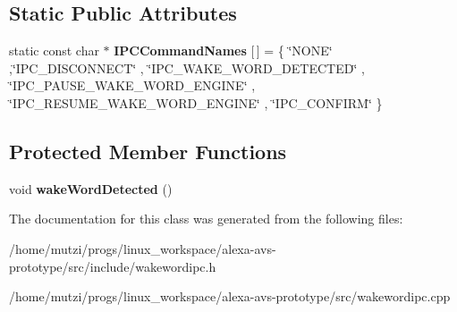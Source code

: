 \subsection*{Static Public Attributes}
\begin{DoxyCompactItemize}
\item 
\mbox{\label{classWakeWord_1_1WakeWordIPC_a1cfa16e30c0ce47fbe759b0f31656a19}} 
static const char $\ast$ {\bfseries I\+P\+C\+Command\+Names} \mbox{[}$\,$\mbox{]} = \{ \char`\"{}N\+O\+NE\char`\"{} ,\char`\"{}I\+P\+C\+\_\+\+D\+I\+S\+C\+O\+N\+N\+E\+CT\char`\"{} , \char`\"{}I\+P\+C\+\_\+\+W\+A\+K\+E\+\_\+\+W\+O\+R\+D\+\_\+\+D\+E\+T\+E\+C\+T\+ED\char`\"{} , \char`\"{}I\+P\+C\+\_\+\+P\+A\+U\+S\+E\+\_\+\+W\+A\+K\+E\+\_\+\+W\+O\+R\+D\+\_\+\+E\+N\+G\+I\+NE\char`\"{} , \char`\"{}I\+P\+C\+\_\+\+R\+E\+S\+U\+M\+E\+\_\+\+W\+A\+K\+E\+\_\+\+W\+O\+R\+D\+\_\+\+E\+N\+G\+I\+NE\char`\"{} , \char`\"{}I\+P\+C\+\_\+\+C\+O\+N\+F\+I\+RM\char`\"{} \}
\end{DoxyCompactItemize}
\subsection*{Protected Member Functions}
\begin{DoxyCompactItemize}
\item 
\mbox{\label{classWakeWord_1_1WakeWordIPC_a4a2607bfe5d6baf62fc210b17822e7c5}} 
void {\bfseries wake\+Word\+Detected} ()
\end{DoxyCompactItemize}


The documentation for this class was generated from the following files\+:\begin{DoxyCompactItemize}
\item 
/home/mutzi/progs/linux\+\_\+workspace/alexa-\/avs-\/prototype/src/include/wakewordipc.\+h\item 
/home/mutzi/progs/linux\+\_\+workspace/alexa-\/avs-\/prototype/src/wakewordipc.\+cpp\end{DoxyCompactItemize}
